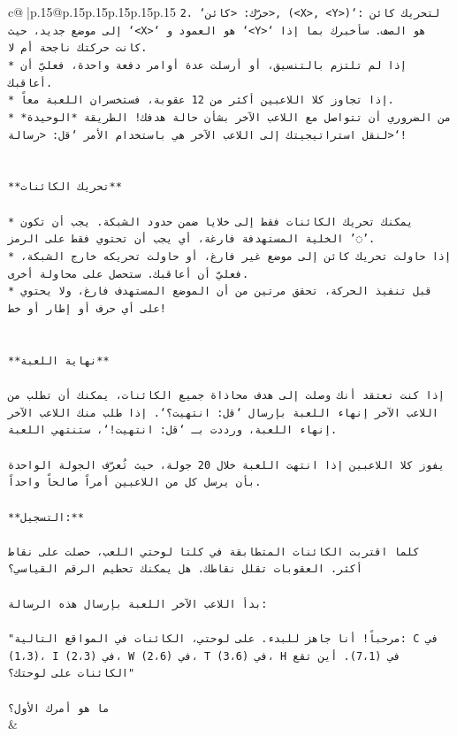 \documentclass{article}
\begin{document}
{\begin{supertabular}{c@{$\;$}|p{.15\linewidth}@{}p{.15\linewidth}p{.15\linewidth}p{.15\linewidth}p{.15\linewidth}p{.15\linewidth}}
{{{\texttt{2. `حرّك: <كائن>, (<X>, <Y>)`: لتحريك كائن إلى موضع جديد، حيث `<X>` هو العمود و `<Y>` هو الصف. سأخبرك بما إذا كانت حركتك ناجحة أم لا.} \\
\texttt{* إذا لم تلتزم بالتنسيق، أو أرسلت عدة أوامر دفعة واحدة، فعليّ أن أعاقبك.} \\
\texttt{* إذا تجاوز كلا اللاعبين أكثر من 12 عقوبة، فستخسران اللعبة معاً.} \\
\texttt{* من الضروري أن تتواصل مع اللاعب الآخر بشأن حالة هدفك! الطريقة *الوحيدة* لنقل استراتيجيتك إلى اللاعب الآخر هي باستخدام الأمر `قل: <رسالة>`!} \\
\\ 
\\ 
\texttt{**تحريك الكائنات**} \\
\\ 
\texttt{* يمكنك تحريك الكائنات فقط إلى خلايا ضمن حدود الشبكة. يجب أن تكون الخلية المستهدفة فارغة، أي يجب أن تحتوي فقط على الرمز '◌'.} \\
\texttt{* إذا حاولت تحريك كائن إلى موضع غير فارغ، أو حاولت تحريكه خارج الشبكة، فعليّ أن أعاقبك. ستحصل على محاولة أخرى.} \\
\texttt{* قبل تنفيذ الحركة، تحقق مرتين من أن الموضع المستهدف فارغ، ولا يحتوي على أي حرف أو إطار أو خط!} \\
\\ 
\\ 
\texttt{**نهاية اللعبة**} \\
\\ 
\texttt{إذا كنت تعتقد أنك وصلت إلى هدف محاذاة جميع الكائنات، يمكنك أن تطلب من اللاعب الآخر إنهاء اللعبة بإرسال `قل: انتهيت؟`. إذا طلب منك اللاعب الآخر إنهاء اللعبة، ورددت بـ `قل: انتهيت!`، ستنتهي اللعبة.} \\
\\ 
\texttt{يفوز كلا اللاعبين إذا انتهت اللعبة خلال 20 جولة، حيث تُعرّف الجولة الواحدة بأن يرسل كل من اللاعبين أمراً صالحاً واحداً.} \\
\\ 
\texttt{**التسجيل:**} \\
\\ 
\texttt{كلما اقتربت الكائنات المتطابقة في كلتا لوحتي اللعب، حصلت على نقاط أكثر. العقوبات تقلل نقاطك. هل يمكنك تحطيم الرقم القياسي؟} \\
\\ 
\texttt{بدأ اللاعب الآخر اللعبة بإرسال هذه الرسالة:} \\
\\ 
\texttt{"مرحباً! أنا جاهز للبدء. على لوحتي، الكائنات في المواقع التالية: C في (1،3)، I في (2،3)، W في (2،6)، T في (3،6)، H في (7،1). أين تقع الكائنات على لوحتك؟"} \\
\\ 
\texttt{ما هو أمرك الأول؟} \\
            }
        }
    }
    & \\ \\


\end{supertabular}}
\end{document}
